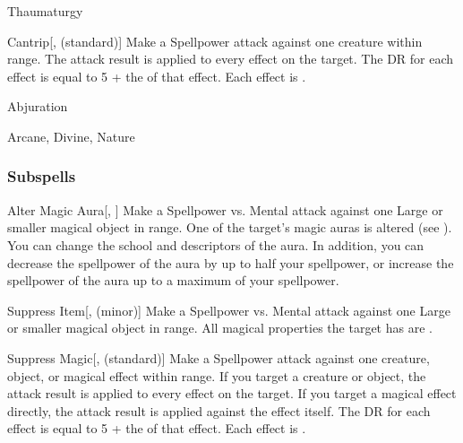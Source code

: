 \newpage
\begin{spellsection}{Thaumaturgy}


\begin{ability}{Cantrip}[,  (standard)]
Make a Spellpower attack against one creature within \rngmed range.
The attack result is applied to every  effect on the target.
The DR for each effect is equal to 5 + the  of that effect.
\hit Each effect is .
\end{ability}




 Abjuration

 Arcane, Divine, Nature
\end{spellsection}


\subsubsection{Subspells}


\begin{ability}[\nth{1}]{Alter Magic Aura}[, ]
Make a Spellpower vs. Mental attack against one Large or smaller magical object in \rngmed range.
\hit One of the target's magic auras is altered (see ).
You can change the school and descriptors of the aura.
In addition, you can decrease the spellpower of the aura by up to half your spellpower, or increase the spellpower of the aura up to a maximum of your spellpower.
\end{ability}
\vspace{0.25em}


\begin{ability}[\nth{1}]{Suppress Item}[,  (minor)]
Make a Spellpower vs. Mental attack against one Large or smaller magical object in \rngmed range.
\hit All magical properties the target has are .
\end{ability}
\vspace{0.25em}


\begin{ability}[\nth{1}]{Suppress Magic}[,  (standard)]
Make a Spellpower attack against one creature, object, or magical effect within \rngmed range.
If you target a creature or object, the attack result is applied to every  effect on the target.
If you target a magical effect directly, the attack result is applied against the effect itself.
The DR for each effect is equal to 5 + the  of that effect.
\hit Each effect is .
\end{ability}
\vspace{0.25em}


